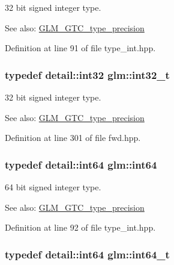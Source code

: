 32 bit signed integer type. \begin{Desc}
\item[See also:]\hyperlink{group__gtc__type__precision}{GLM\_\-GTC\_\-type\_\-precision} \end{Desc}


Definition at line 91 of file type\_\-int.hpp.\hypertarget{group__gtc__type__precision_gb870c0eb6f525b0c8c4716762e0fc3a8}{
\subsubsection[int32\_\-t]{\setlength{\rightskip}{0pt plus 5cm}typedef detail::int32 {\bf glm::int32\_\-t}}}
\label{group__gtc__type__precision_gb870c0eb6f525b0c8c4716762e0fc3a8}


32 bit signed integer type. \begin{Desc}
\item[See also:]\hyperlink{group__gtc__type__precision}{GLM\_\-GTC\_\-type\_\-precision} \end{Desc}


Definition at line 301 of file fwd.hpp.\hypertarget{group__gtc__type__precision_g435d75819cce297cc5fa21bd84ef89a5}{
\subsubsection[int64]{\setlength{\rightskip}{0pt plus 5cm}typedef detail::int64 {\bf glm::int64}}}
\label{group__gtc__type__precision_g435d75819cce297cc5fa21bd84ef89a5}


64 bit signed integer type. \begin{Desc}
\item[See also:]\hyperlink{group__gtc__type__precision}{GLM\_\-GTC\_\-type\_\-precision} \end{Desc}


Definition at line 92 of file type\_\-int.hpp.\hypertarget{group__gtc__type__precision_g6abb23fbf4e39c50ec5341160b5da5ab}{
\subsubsection[int64\_\-t]{\setlength{\rightskip}{0pt plus 5cm}typedef detail::int64 {\bf glm::int64\_\-t}}}
\label{group__gtc__type__precision_g6abb23fbf4e39c50ec5341160b5da5ab}


